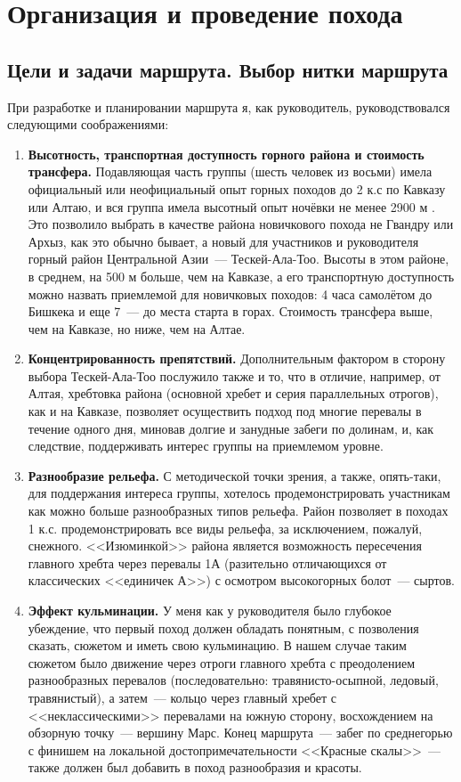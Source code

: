 \section{Организация и проведение похода}
\subsection{Цели и задачи маршрута. Выбор нитки маршрута}
При разработке и планировании маршрута я, как руководитель, руководствовался следующими соображениями:
\begin{enumerate} 
	\item \textbf{Высотность, транспортная доступность горного района и стоимость трансфера.}
	Подавляющая часть группы (шесть человек из восьми) имела официальный или неофициальный опыт горных походов до 2 к.с по Кавказу \cite{Snegovskaya2024} или Алтаю, и вся группа имела высотный опыт ночёвки не менее 2900 м \cite{ostapiv2025}. Это позволило выбрать в качестве района новичкового похода не Гвандру или Архыз, как это обычно бывает, а новый для участников и руководителя горный район Центральной Азии~--- Тескей-Ала-Тоо. Высоты в этом районе, в среднем, на 500 м больше, чем на Кавказе, а его транспортную доступность можно назвать приемлемой для новичковых походов: 4 часа самолётом до Бишкека и еще 7~--- до места старта в горах. Стоимость трансфера выше, чем на Кавказе, но ниже, чем на Алтае. 
		
	\item \textbf{Концентрированность препятствий.}
	Дополнительным фактором в сторону выбора Тескей-Ала-Тоо послужило также и то, что в отличие, например, от Алтая, хребтовка района (основной хребет и серия параллельных отрогов), как и на Кавказе, позволяет осуществить подход под многие перевалы в течение одного дня, миновав долгие и занудные забеги по долинам, и, как следствие, поддерживать интерес группы на приемлемом уровне.
	
	\item \textbf{Разнообразие рельефа.} 
	С методической точки зрения, а также, опять-таки, для поддержания интереса группы, хотелось продемонстрировать участникам как можно больше разнообразных типов рельефа. Район позволяет в походах 1 к.с. продемонстрировать все виды рельефа, за исключением, пожалуй, снежного. <<Изюминкой>> района является возможность пересечения главного хребта через перевалы 1А (разительно отличающихся от классических <<единичек А>>) с осмотром высокогорных болот~--- сыртов.
	
	\item \textbf{Эффект кульминации.}
	У меня как у руководителя было глубокое убеждение, что первый поход должен обладать понятным, с позволения сказать, сюжетом и иметь свою кульминацию. В нашем случае таким сюжетом было движение через отроги главного хребта с преодолением разнообразных перевалов (последовательно: травянисто-осыпной, ледовый, травянистый), а затем~--- кольцо через главный хребет с <<неклассическими>> перевалами на южную сторону, восхождением на обзорную точку~--- вершину Марс. Конец маршрута~--- забег по среднегорью с финишем на локальной достопримечательности <<Красные скалы>>~--- также должен был добавить в поход разнообразия и красоты.
	

\end{enumerate}
